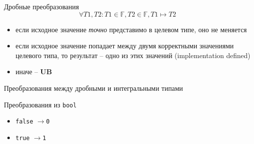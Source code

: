 \documentclass[unknownkeysallowed,xcolor=table]{beamer}
\newcommand{\rarr}{$\rightarrow$}
\begin{document}
\begin{frame}[fragile]{Дробные преобразования}
  \[
    \forall T1, T2: T1 \in \mathbb{F}, T2 \in \mathbb{F}, T1 \mapsto T2
  \]

  \vspace{1em}

  \begin{itemize}
    \item если исходное значение \emph{точно} представимо в целевом типе, оно не меняется \vspace{1em}
    \item если исходное значение попадает между двумя корректными значениями целевого типа, то результат -- одно из этих значений (implementation defined) \vspace{1em}
    \item иначе -- \textbf{UB}
  \end{itemize}
\end{frame}

\begin{frame}[fragile]{Преобразования между дробными и интегральными типами}

  \vspace{1em}
  Преобразования из \lstinline{bool}
  \begin{itemize}
    \item \lstinline{false} \rarr \lstinline{0} \vspace{1.5em}
    \item \lstinline{true} \rarr \lstinline{1}
  \end{itemize}
\end{frame}
\end{document}
